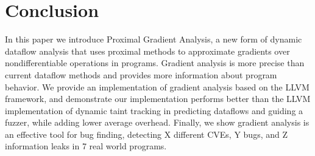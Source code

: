 \section{Conclusion}

In this paper we introduce Proximal Gradient Analysis, a new form of dynamic dataflow analysis that uses proximal methods to approximate gradients over nondifferentiable operations in programs. Gradient analysis is more precise than current dataflow methods and provides more information about program behavior. We provide an implementation of gradient analysis based on the LLVM framework, and demonstrate our implementation performs better than the LLVM implementation of dynamic taint tracking in predicting dataflows and guiding a fuzzer, while adding lower average overhead. Finally, we show gradient analysis is an effective tool for bug finding, detecting X different CVEs, Y bugs, and Z information leaks in 7 real world programs.
